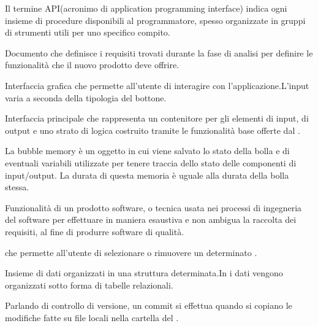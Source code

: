 





\makeFrontPage



\clearpage
\tableofcontents

Il termine API(acronimo di application programming interface) indica ogni insieme di procedure disponibili al programmatore, spesso organizzate in gruppi di strumenti utili per uno specifico compito.

Documento che definisce i requisiti trovati durante la fase di analisi per definire le funzionalit\`a che il nuovo prodotto deve offrire.
\clearpage

Interfaccia grafica che permette all’utente di interagire con l’applicazione.L’input varia a seconda della tipologia del bottone. 


Interfaccia principale che rappresenta un contenitore per gli elementi di input, di output e uno strato di logica costruito tramite le funzionalit\`a base offerte dal .

La bubble memory è un oggetto  in cui viene salvato lo stato della bolla e di eventuali variabili utilizzate per tenere traccia dello stato delle componenti di input/output.
La durata di questa memoria è uguale alla durata della bolla stessa.
\clearpage

Funzionalità di un prodotto software, o tecnica usata nei processi di ingegneria del software per effettuare in maniera esaustiva e non ambigua la raccolta dei requisiti, al fine di produrre software di qualità.

 che permette all’utente di selezionare o rimuovere un determinato .

Insieme di dati organizzati in una struttura determinata.In  i dati vengono organizzati sotto forma di tabelle relazionali.

Parlando di controllo di versione, un commit si effettua quando si copiano le modifiche fatte su file locali nella cartella del .

